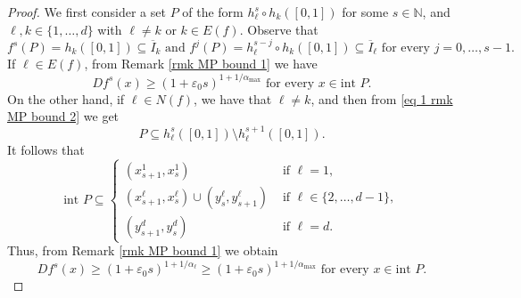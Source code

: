 \documentclass[10pt,a4paper]{amsart}
\numberwithin{equation}{section} %
\numberwithin{figure}{section} %
\newcommand{\N}{\mathbb{N}}
\renewcommand{\=}{\coloneqq}
\begin{document}
\begin{proof}
    We first consider a set $P$ of the form  $h_\ell^s\circ h_k([0,1])$ for some $s\in\N$, and $\ell,k \in \{1,\ldots,d\}$ with $\ell\neq k$ or $k\in E(f)$.  Observe that
    \begin{equation}\label{eq 1 rmk MP bound 2}
        f^s(P)= h_k([0,1])\subseteq \overline{I}_k \text{ and } f^j(P)= h^{s-j}_{\ell}\circ h_k([0,1])\subseteq \overline{I}_\ell \text{ for every }j=0,\ldots,s-1.
    \end{equation}
    If $\ell\in E(f)$, from Remark \ref{rmk MP bound 1} we have 
    \begin{equation}\label{eq bound for Df^s E(f)}
        Df^s(x) \geq (1+\varepsilon_0 s)^{1+1/\alpha_{\max}}\text{ for every } x\in \text{int } P.
    \end{equation}
    On the other hand, if $\ell\in N(f)$, we have that $\ell\neq k$, and then from \eqref{eq 1 rmk MP bound 2} we get
    \begin{equation*}
        P \subseteq h_{\ell}^s([0,1])\setminus h_{\ell}^{s+1}([0,1]).
    \end{equation*}
    It follows that
    \begin{equation}\label{eq lower bound Df^s}
        \text{int }P\subseteq 
        \begin{cases}
            (x_{s+1}^1, x_s^1)& \text{ if } \ell=1,\\
            (x_{s+1}^\ell, x_s^\ell)\cup(y_s^\ell, y_{s+1}^\ell) & \text{ if } \ell\in \{2,\ldots,d-1\},\\
            (y_{s+1}^d, y_s^d) & \text{ if } \ell=d.
        \end{cases}
    \end{equation}
    Thus, from Remark \ref{rmk MP bound 1} we obtain
    \begin{equation}\label{eq 2 rmk MP bound 2}
         Df^s(x) \geq (1+\varepsilon_0 s)^{1+1/\alpha_\ell}  \geq (1+\varepsilon_0 s)^{1+1/\alpha_{\max}} \text{ for every } x\in \text{int }P.
    \end{equation}


\end{proof}
\end{document}
